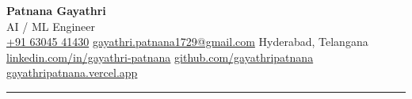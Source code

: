 \documentclass[10pt, a4paper]{article}
\begin{document}
\noindent
\begin{minipage}{\textwidth}
  \begin{center}
    {\LARGE\textbf{\color{accent}Patnana Gayathri}}\\[3pt]
    {\small\color{mutedtext}AI / ML Engineer}\\[5pt]
    \footnotesize
    \faPhone\;\href{tel:+916304541430}{+91 63045 41430}\quad
    \faEnvelope\;\href{mailto:gayathri.patnana1729@gmail.com}{gayathri.patnana1729@gmail.com}\quad
    \faMapMarker*\;Hyderabad, Telangana\\[2pt]
    \faLinkedin\;\href{https://www.linkedin.com/in/gayathri-patnana-225b27224}{linkedin.com/in/gayathri-patnana}\quad
    \faGithub\;\href{https://github.com/gayathripatnana}{github.com/gayathripatnana}\quad
    \faGlobe\;\href{https://gayathripatnana.vercel.app}{gayathripatnana.vercel.app}
  \end{center}
\end{minipage}

\vspace{4pt}
{\color{rulecol}\rule{\textwidth}{1pt}}
\vspace{2pt}
\end{document}
